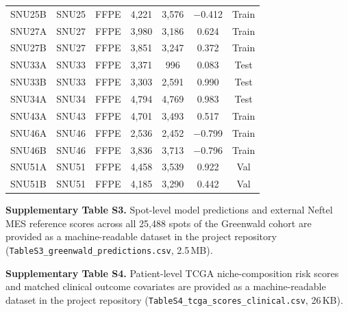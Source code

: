 \documentclass[11pt,letterpaper]{article}
\begin{document}
\begin{table}[H]
\begin{tabular}{llccccc}
SNU25B         & SNU25   & FFPE   & 4{,}221 & 3{,}576 & $-$0.412 & Train \\
SNU27A         & SNU27   & FFPE   & 3{,}980 & 3{,}186 & 0.624  & Train \\
SNU27B         & SNU27   & FFPE   & 3{,}851 & 3{,}247 & 0.372  & Train \\
SNU33A         & SNU33   & FFPE   & 3{,}371 & 996     & 0.083  & Test \\
SNU33B         & SNU33   & FFPE   & 3{,}303 & 2{,}591 & 0.990  & Test \\
SNU34A         & SNU34   & FFPE   & 4{,}794 & 4{,}769 & 0.983  & Test \\
SNU43A         & SNU43   & FFPE   & 4{,}701 & 3{,}493 & 0.517  & Train \\
SNU46A         & SNU46   & FFPE   & 2{,}536 & 2{,}452 & $-$0.799 & Train \\
SNU46B         & SNU46   & FFPE   & 3{,}836 & 3{,}713 & $-$0.796 & Train \\
SNU51A         & SNU51   & FFPE   & 4{,}458 & 3{,}539 & 0.922  & Val \\
SNU51B         & SNU51   & FFPE   & 4{,}185 & 3{,}290 & 0.442  & Val \\
\bottomrule
\end{tabular}
\end{table}

\vspace{1em}
\noindent\textbf{Supplementary Table S3.} Spot-level model predictions and external Neftel MES reference scores across all 25{,}488 spots of the Greenwald cohort are provided as a machine-readable dataset in the project repository (\texttt{TableS3\_}\allowbreak\texttt{greenwald\_}\allowbreak\texttt{predictions.csv}, 2.5\,MB).

\vspace{0.5em}
\begingroup\sloppy
\noindent\textbf{Supplementary Table S4.} Patient-level TCGA niche-composition risk scores and matched clinical outcome covariates are provided as a machine-readable dataset in the project repository (\texttt{TableS4\_}\allowbreak\texttt{tcga\_}\allowbreak\texttt{scores\_}\allowbreak\texttt{clinical.csv}, 26\,KB).
\par\endgroup

\clearpage
\end{document}
